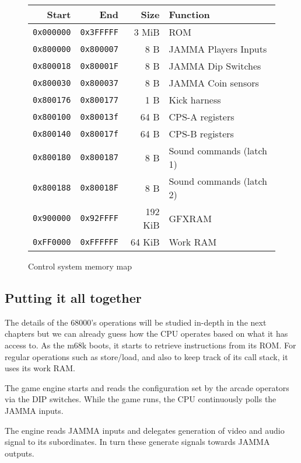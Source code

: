 \begin{figure}[H]
{
\begin{tabularx}{\textwidth}{rrrX}
  \textbf{Start } & \textbf{End  } & \textbf{Size } & \textbf{Function } \\               
  \toprule    
  \texttt{0x000000} & \texttt{0x3FFFFF} & 3 MiB & ROM \\
  \toprule    
  \texttt{0x800000} & \texttt{0x800007} & 8 B & JAMMA Players Inputs \\
  \texttt{0x800018} & \texttt{0x80001F} & 8 B & JAMMA Dip Switches \\
  \texttt{0x800030} & \texttt{0x800037} & 8 B & JAMMA Coin sensors \\
  \texttt{0x800176} & \texttt{0x800177} & 1 B & Kick harness \\
\toprule    
  \texttt{0x800100} & \texttt{0x80013f} & 64 B & CPS-A registers\\
  \texttt{0x800140} & \texttt{0x80017f} & 64 B & CPS-B registers\\
\toprule    
  \texttt{0x800180} & \texttt{0x800187} & 8 B & Sound commands (latch 1)\\
  \texttt{0x800188} & \texttt{0x80018F} & 8 B & Sound commands (latch 2)\\
  \toprule    
  \texttt{0x900000} & \texttt{0x92FFFF} & 192 KiB & GFXRAM\\
  \texttt{0xFF0000} & \texttt{0xFFFFFF} & 64 KiB & Work RAM \\
\end{tabularx}%
}\caption*{Control system memory map}
\end{figure} \label{m68k_mm}

\subsection{Putting it all together}

The details of the 68000's operations will be studied in-depth in the next chapters but we can already guess how the CPU operates based on what it has access to. As the m68k boots, it starts to retrieve instructions from its ROM. For regular operations such as store/load, and also to keep track of its call stack, it uses its work RAM. 

The game engine starts and reads the configuration set by the arcade operators via the DIP switches. While the game runs, the CPU continuously polls the JAMMA inputs.

The engine reads JAMMA inputs and delegates generation of video and audio signal to its subordinates. In turn these generate signals towards JAMMA outputs.

